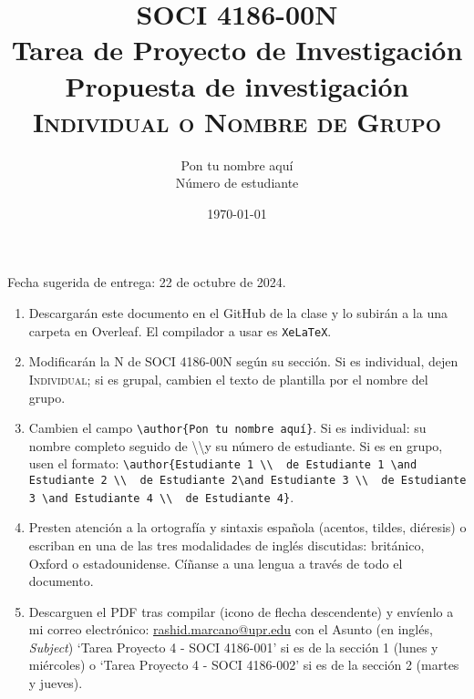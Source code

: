 \documentclass[11pt]{article}
\title{SOCI 4186-00N\\ Tarea de Proyecto de Investigación \textnumero 4 \\ Propuesta de investigación \\ \textsc{Individual o Nombre de Grupo}}
\author{Pon tu nombre aquí \\ Número de estudiante}
\date{\today} %
\begin{document}
\singlespacing
\maketitle
Fecha sugerida de entrega: 22 de octubre de 2024.

\begin{enumerate}
    \item Descargarán este documento en el GitHub de la clase y lo subirán a la una carpeta en Overleaf. El compilador a usar es \texttt{XeLaTeX}.
    \item Modificarán la N de SOCI 4186-00N según su sección. Si es individual, dejen \textsc{Individual}; si es grupal, cambien el texto de plantilla por el nombre del grupo.
    \item Cambien el campo \texttt{\textbackslash author\{Pon tu nombre aquí\}}. Si es individual: su nombre completo seguido de \textbackslash\textbackslash y su número de estudiante. Si es en grupo, usen el formato: \texttt{\textbackslash author\{Estudiante 1 \textbackslash\textbackslash \ \textnumero\ de Estudiante 1 \textbackslash and Estudiante 2 \textbackslash\textbackslash \ \textnumero\ de Estudiante 2\textbackslash and Estudiante 3 \textbackslash\textbackslash \ \textnumero\ de Estudiante 3 \textbackslash and Estudiante 4 \textbackslash\textbackslash\ \textnumero\ de Estudiante 4\}}.
    \item Presten atención a la ortografía y sintaxis española (acentos, tildes, diéresis) o escriban en una de las tres modalidades de inglés discutidas: británico, Oxford o estadounidense. Cíñanse a una lengua a través de todo el documento.
    \item Descarguen el PDF tras compilar (icono de flecha descendente) y envíenlo a mi correo electrónico: \href{mailto:rashid.marcano@upr.edu}{rashid.marcano@upr.edu}%
     con el Asunto (en inglés, \textit{Subject}) `Tarea Proyecto 4 - SOCI 4186-001' si es de la sección 1 (lunes y miércoles) o `Tarea Proyecto 4 - SOCI 4186-002' si es de la sección 2 (martes y jueves).
\end{enumerate}
\end{document}

